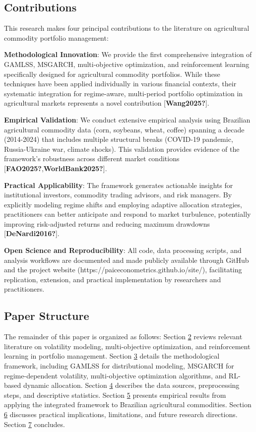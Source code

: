\documentclass[
  10pt,
  a4paper,
]{article}
\begin{document}
\subsection{Contributions}\label{sec-contributions}

This research makes four principal contributions to the literature on
agricultural commodity portfolio management:

\textbf{Methodological Innovation}: We provide the first comprehensive
integration of GAMLSS, MSGARCH, multi-objective optimization, and
reinforcement learning specifically designed for agricultural commodity
portfolios. While these techniques have been applied individually in
various financial contexts, their systematic integration for
regime-aware, multi-period portfolio optimization in agricultural
markets represents a novel contribution {[}\textbf{Wang2025?}{]}.

\textbf{Empirical Validation}: We conduct extensive empirical analysis
using Brazilian agricultural commodity data (corn, soybeans, wheat,
coffee) spanning a decade (2014-2024) that includes multiple structural
breaks (COVID-19 pandemic, Russia-Ukraine war, climate shocks). This
validation provides evidence of the framework's robustness across
different market conditions
{[}\textbf{FAO2025?},\textbf{WorldBank2025?}{]}.

\textbf{Practical Applicability}: The framework generates actionable
insights for institutional investors, commodity trading advisors, and
risk managers. By explicitly modeling regime shifts and employing
adaptive allocation strategies, practitioners can better anticipate and
respond to market turbulence, potentially improving risk-adjusted
returns and reducing maximum drawdowns {[}\textbf{DeNardi2016?}{]}.

\textbf{Open Science and Reproducibility}: All code, data processing
scripts, and analysis workflows are documented and made publicly
available through GitHub and the project website
(https://paiceconometrics.github.io/site/), facilitating replication,
extension, and practical implementation by researchers and
practitioners.

\subsection{Paper Structure}\label{sec-structure}

The remainder of this paper is organized as follows: Section
\hyperref[sec-literature]{2} reviews relevant literature on volatility
modeling, multi-objective optimization, and reinforcement learning in
portfolio management. Section \hyperref[sec-methodology]{3} details the
methodological framework, including GAMLSS for distributional modeling,
MSGARCH for regime-dependent volatility, multi-objective optimization
algorithms, and RL-based dynamic allocation. Section
\hyperref[sec-data]{4} describes the data sources, preprocessing steps,
and descriptive statistics. Section \hyperref[sec-results]{5} presents
empirical results from applying the integrated framework to Brazilian
agricultural commodities. Section \hyperref[sec-discussion]{6} discusses
practical implications, limitations, and future research directions.
Section \hyperref[sec-conclusion]{7} concludes.
\end{document}
